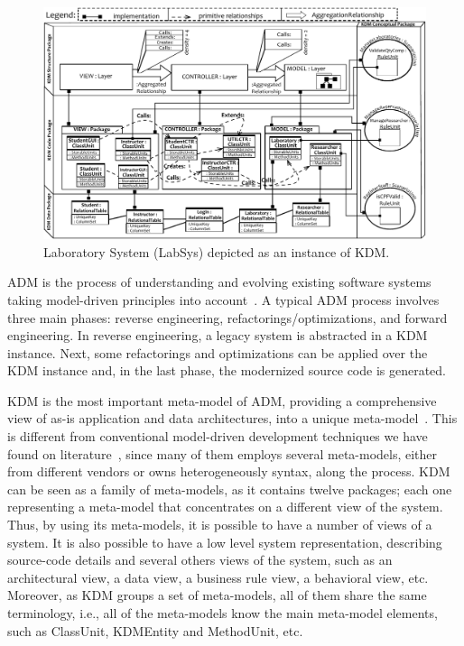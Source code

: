 
 
\begin{figure}[t]
	\centering
	\includegraphics[scale=0.78]{figuras/NovoSystem9}
	\caption{Laboratory System (LabSys) depicted as an instance of KDM.}
	\label{fig:system}
\end{figure}

ADM is the process of understanding  and evolving existing software systems taking model-driven principles into account~\cite{1686216}. A typical ADM process involves three main phases: reverse engineering, refactorings/optimizations, and forward engineering. In reverse engineering, a legacy system is abstracted in a KDM instance. Next, some refactorings and optimizations can be applied over the KDM instance and, in the last phase, the modernized source code is generated. 

KDM is the most important meta-model of ADM, providing a comprehensive view of as-is application and data architectures, into a unique meta-model~\cite{Perez-Castillo:2011:KDM}. This is different from conventional model-driven development techniques we have found on literature~\cite{7051941}, since many of them employs several meta-models, either from different vendors or owns heterogeneously syntax, along the process. KDM can be seen as a family of meta-models, as it contains twelve packages; each one representing a meta-model that concentrates on a different view of the system. Thus, by using its  meta-models, it is possible to have a number of views of a system. It is also possible to have a low level system representation, describing source-code details and several others views of the system, such as an architectural view, a data view, a business rule view, a behavioral view, etc. Moreover, as KDM groups a set of meta-models, all of them share the same terminology, i.e., all of the meta-models know the main meta-model elements, such as ClassUnit, KDMEntity and MethodUnit, etc.

